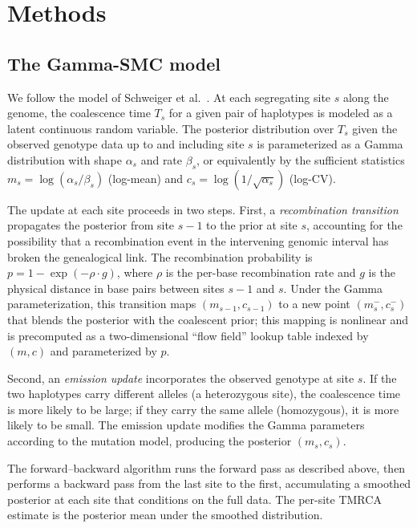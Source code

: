 \documentclass[10pt,letterpaper]{article}
\begin{document}
\section*{Methods}

\subsection*{The Gamma-SMC model}

We follow the model of Schweiger et al.\ \cite{Schweiger2023}.
At each segregating site $s$ along the genome, the coalescence time $T_s$ for a given pair of haplotypes is modeled as a latent continuous random variable.
The posterior distribution over $T_s$ given the observed genotype data up to and including site $s$ is parameterized as a Gamma distribution with shape $\alpha_s$ and rate $\beta_s$, or equivalently by the sufficient statistics $m_s = \log(\alpha_s / \beta_s)$ (log-mean) and $c_s = \log(1/\sqrt{\alpha_s})$ (log-CV).

The update at each site proceeds in two steps.
First, a \emph{recombination transition} propagates the posterior from site $s-1$ to the prior at site $s$, accounting for the possibility that a recombination event in the intervening genomic interval has broken the genealogical link.
The recombination probability is $p = 1 - \exp(-\rho \cdot g)$, where $\rho$ is the per-base recombination rate and $g$ is the physical distance in base pairs between sites $s-1$ and $s$.
Under the Gamma parameterization, this transition maps $(m_{s-1}, c_{s-1})$ to a new point $(m_s^{-}, c_s^{-})$ that blends the posterior with the coalescent prior; this mapping is nonlinear and is precomputed as a two-dimensional ``flow field'' lookup table indexed by $(m, c)$ and parameterized by $p$.

Second, an \emph{emission update} incorporates the observed genotype at site $s$.
If the two haplotypes carry different alleles (a heterozygous site), the coalescence time is more likely to be large; if they carry the same allele (homozygous), it is more likely to be small.
The emission update modifies the Gamma parameters according to the mutation model, producing the posterior $(m_s, c_s)$.

The forward--backward algorithm runs the forward pass as described above, then performs a backward pass from the last site to the first, accumulating a smoothed posterior at each site that conditions on the full data.
The per-site TMRCA estimate is the posterior mean under the smoothed distribution.
\end{document}
